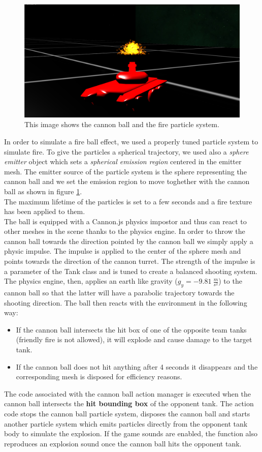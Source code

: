 \documentclass[14pt]{article}
\begin{document}
\begin{figure}[H]
\includegraphics[width=12cm]{images/cannonBall2.png}
\caption{This image shows the cannon ball and the fire particle system.}
\label{img:cannon}
\end{figure}




In order to simulate a fire ball effect, we used a properly tuned particle system to simulate fire. To give the particles a spherical trajectory, we used also a \textit{sphere emitter} object which sets a \textit{spherical emission region} centered in the emitter mesh. The emitter source of the particle system is the sphere representing the cannon ball and we set the emission region to move toghether with the cannon ball as shown in figure \ref{img:cannon}.\\
The maximum lifetime of the particles is set to a few seconds and a fire texture has been applied to them.\\
The ball is equipped with a Cannon.js physics impostor and thus can react to other meshes in the scene thanks to the physics engine. In order to throw the cannon ball towards the direction pointed by the cannon ball we simply apply a physic impulse. The impulse is applied to the center of the sphere mesh and points towards the direction of the cannon turret. The strength of the impulse is a parameter of the Tank class and is tuned to create a balanced shooting system. The physics engine, then, applies an earth like gravity  (\(g_{y} = -9.81 \ \frac{m}{s^{2}}\)) to the cannon ball so that the latter will have a parabolic trajectory towards the shooting direction. The ball then reacts with the environment in the following way:
\begin{itemize}
\item  If the cannon ball intersects the hit box of one of the opposite team tanks (friendly fire is not allowed), it will explode and cause damage to the target tank. 
\item If the cannon ball does not hit anything after 4 seconds it disappears and the corresponding mesh is disposed for efficiency reasons.
\end{itemize}
The code associated with the cannon ball action manager is executed when the cannon ball intersects the \textbf{hit bounding box} of the opponent tank. The action code stops the cannon ball particle system, disposes the cannon ball and starts another particle system which emits particles directly from the opponent tank body to simulate the explosion. If the game sounds are enabled, the function also reproduces an explosion sound once the cannon ball hits the opponent tank.
\end{document}
